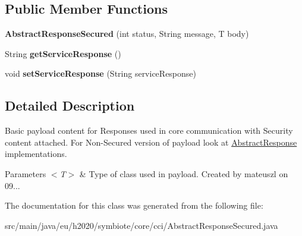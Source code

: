 \subsection*{Public Member Functions}
\begin{DoxyCompactItemize}
\item 
\mbox{\label{classeu_1_1h2020_1_1symbiote_1_1core_1_1cci_1_1AbstractResponseSecured_a563dcc4abf24856f2a1e87abeaeb26f8}} 
{\bfseries Abstract\+Response\+Secured} (int status, String message, T body)
\item 
\mbox{\label{classeu_1_1h2020_1_1symbiote_1_1core_1_1cci_1_1AbstractResponseSecured_a856dc38e83c79e7c040d5ea647c67679}} 
String {\bfseries get\+Service\+Response} ()
\item 
\mbox{\label{classeu_1_1h2020_1_1symbiote_1_1core_1_1cci_1_1AbstractResponseSecured_ab04a6a77fd9511b029cdd65a516af754}} 
void {\bfseries set\+Service\+Response} (String service\+Response)
\end{DoxyCompactItemize}


\subsection{Detailed Description}
Basic payload content for Responses used in core communication with Security content attached. For Non-\/\+Secured version of payload look at \hyperlink{classeu_1_1h2020_1_1symbiote_1_1core_1_1cci_1_1AbstractResponse}{Abstract\+Response} implementations.


\begin{DoxyParams}{Parameters}
{\em $<$\+T$>$} & Type of class used in payload. Created by mateuszl on 09... \\
\hline
\end{DoxyParams}


The documentation for this class was generated from the following file\+:\begin{DoxyCompactItemize}
\item 
src/main/java/eu/h2020/symbiote/core/cci/Abstract\+Response\+Secured.\+java\end{DoxyCompactItemize}
